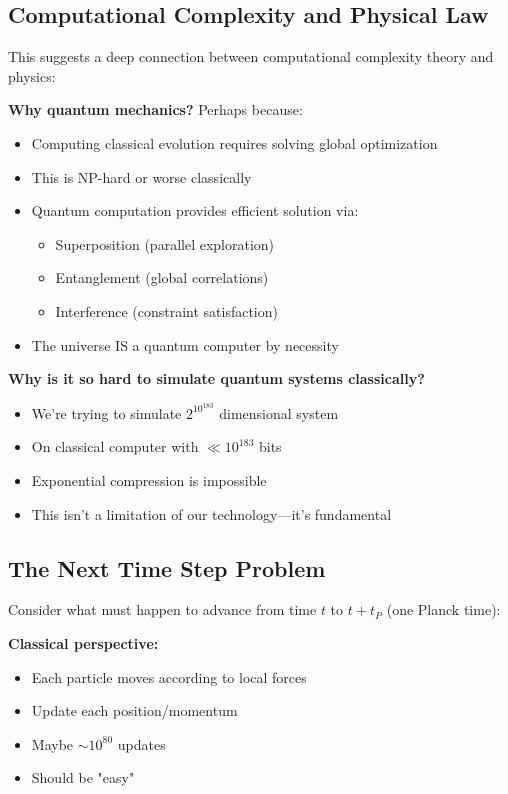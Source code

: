 ﻿\documentclass{article}
\begin{document}
\subsection{Computational Complexity and Physical Law}


This suggests a deep connection between computational complexity theory and physics:


\textbf{Why quantum mechanics?}
Perhaps because:
\begin{itemize}
\item Computing classical evolution requires solving global optimization
\item This is NP-hard or worse classically
\item Quantum computation provides efficient solution via:
  \begin{itemize}
  \item Superposition (parallel exploration)
  \item Entanglement (global correlations)
  \item Interference (constraint satisfaction)
  \end{itemize}
\item The universe IS a quantum computer by necessity
\end{itemize}


\textbf{Why is it so hard to simulate quantum systems classically?}
\begin{itemize}
\item We're trying to simulate $2^{10^{183}}$ dimensional system
\item On classical computer with $\ll 10^{183}$ bits
\item Exponential compression is impossible
\item This isn't a limitation of our technology—it's fundamental
\end{itemize}


\subsection{The Next Time Step Problem}


Consider what must happen to advance from time $t$ to $t + t_P$ (one Planck time):


\textbf{Classical perspective:} 
\begin{itemize}
\item Each particle moves according to local forces
\item Update each position/momentum
\item Maybe $\sim 10^{80}$ updates
\item Should be "easy"
\end{itemize}
\end{document}
